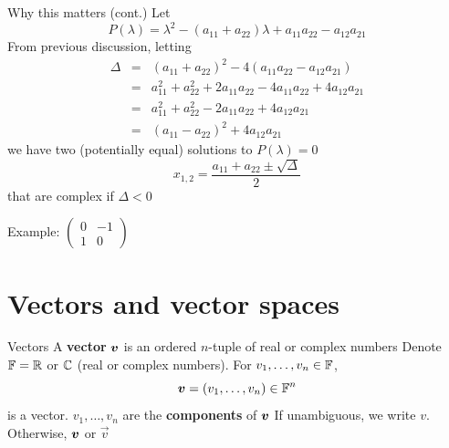 \documentclass[aspectratio=169]{beamer}
\begin{document}
\begin{frame}{Why this matters (cont.)}
Let
\[
P(\lambda) = \lambda^2 - (a_{11}+a_{22})\lambda + a_{11}a_{22}-a_{12}a_{21}
\]
From previous discussion, letting 
\[
\begin{matrix} 
\Delta &=& (a_{11}+a_{22})^2-4(a_{11}a_{22}-a_{12}a_{21}) \\
&=& a_{11}^2+a_{22}^2+2a_{11}a_{22}
-4a_{11}a_{22}+4a_{12}a_{21} \\
&=& a_{11}^2+a_{22}^2-2a_{11}a_{22}
+4a_{12}a_{21} \\
&=& (a_{11}-a_{22})^2+4a_{12}a_{21}
\end{matrix}
\]
we have two (potentially equal) solutions to $P(\lambda)=0$
\[
x_{1,2} = \frac{a_{11}+a_{22}\pm \sqrt{\Delta}}{2}
\]
that are complex if $\Delta<0$

Example:
$\begin{pmatrix}
0 & -1 \\ 1 & 0
\end{pmatrix}$

\end{frame}

\section{Vectors and vector spaces}

\begin{frame}{Vectors}
	A \textbf{vector} $\bm{v}$ is an ordered $n$-tuple of real or complex numbers
	\vfill 
	Denote $\mathbb{F}=\mathbb{R}$ or $\mathbb{C}$ (real or complex numbers). 
	For
	$v_1,\ldots,v_n\in\mathbb{F}$, 
	\[
	\bm{v}=(v_1,\ldots,v_n)\in\mathbb{F}^n
	\]
	is a vector. $v_1,\ldots,v_n$ are the \textbf{components} of $\bm{v}$
	\vfill
	If unambiguous, we write $v$. Otherwise, $\bm{v}$ or $\vec{v}$
\end{frame}
\end{document}
